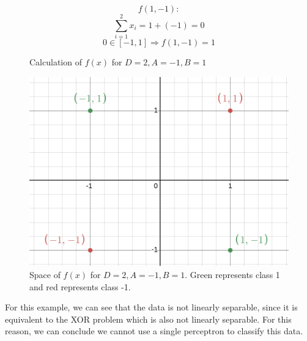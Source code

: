 \documentclass[12pt]{article}
\begin{document}
\begin{itemize}
\begin{figure}[H]
\begin{minipage}{0.5\linewidth}
                  \begin{equation*}
                      f(1, -1):
                  \end{equation*}
                  \begin{equation*}
                      \sum_{i=1}^{2} x_i = 1 + (-1) = 0
                  \end{equation*}
                  \begin{equation*}
                      0 \in [-1, 1] \Rightarrow f(1, -1) = 1
                  \end{equation*}
              \end{minipage}
              \caption{Calculation of $f(x)$ for $D=2, A=-1, B=1$}
              \label{fig:3a:calc}
          \end{figure}

          \begin{figure}[H]
              \centering
              \includegraphics[width=0.5\linewidth]{../outputs/hw1-q3-a.png}
              \caption{Space of $f(x)$ for $D=2, A=-1, B=1$. Green represents class 1 and red represents class -1.}
              \label{fig:3a:graph}
          \end{figure}

          For this example, we can see that the data is not linearly separable, since it is equivalent to the XOR problem which is also not linearly separable. For this reason, we can conclude we cannot use a single perceptron to classify this data.

\end{itemize}
\end{document}
